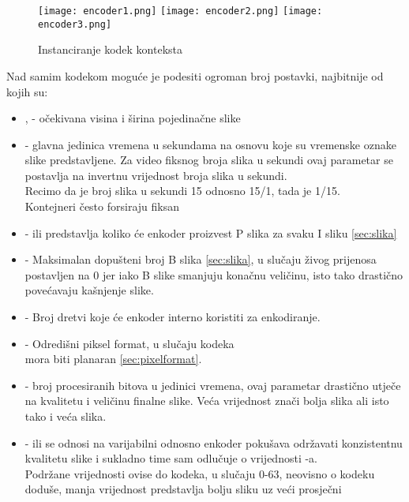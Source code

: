 \begin{figure} [h]
  \texttt{[image: encoder1.png]}
  \texttt{[image: encoder2.png]}
  \texttt{[image: encoder3.png]}
  \caption{Instanciranje kodek konteksta}
\end{figure}
\noindent
Nad samim kodekom moguće je podesiti ogroman broj postavki, najbitnije od kojih su: 
\begin{itemize}
  \item {},  - očekivana visina i širina pojedinačne slike
  \item {} - glavna jedinica vremena u sekundama na osnovu koje su vremenske oznake slike 
    predstavljene. Za video fiksnog broja slika u sekundi ovaj parametar se postavlja na invertnu vrijednost broja slika u sekundi. \\
    Recimo da je broj slika u sekundi 15 odnosno 15/1, tada je  1/15. \\
    Kontejneri često forsiraju fiksan 
  \item {} -  ili  predstavlja koliko će enkoder proizvest
   P slika za svaku I sliku \ref{sec:slika}
  \item {} - Maksimalan dopušteni broj B slika \ref{sec:slika}, u slučaju živog prijenosa postavljen na 0
   jer iako B slike smanjuju konačnu veličinu, isto tako drastično povećavaju kašnjenje slike.
  \item {} - Broj dretvi koje će enkoder interno koristiti za enkodiranje.
  \item {} - Odredišni piksel format, u slučaju  kodeka \\ mora biti planaran \ref{sec:pixelformat}.
  \item {} - broj procesiranih bitova u jedinici vremena, ovaj parametar drastično utječe na kvalitetu
    i veličinu finalne slike. Veća vrijednost znači bolja slika ali isto tako i veća slika.
  \item {} -  ili  se odnosi na varijabilni 
    odnosno enkoder pokušava održavati konzistentnu kvalitetu slike i sukladno time sam odlučuje o vrijednosti 
    -a. \\
    Podržane vrijednosti ovise do kodeka, u slučaju  0-63, neovisno o kodeku doduše,
    manja vrijednost predstavlja bolju sliku uz veći prosječni 
\end{itemize}

